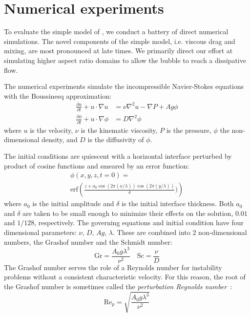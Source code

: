 \section{Numerical experiments} 

To evaluate the simple model of , we conduct a battery of direct numerical simulations.
The novel components of the simple model, i.e. viscous drag and mixing, are most pronounced at late times.
We primarily direct our effort at simulating higher aspect ratio domains to allow the bubble to reach a dissipative flow.

The numerical experiments simulate the incompressible Navier-Stokes equations with the Boussinesq approximation:
\begin{align}
\frac{\partial u}{\partial t} + u \cdot \nabla u &= \nu \nabla^2 u - \nabla P + A g \phi \\
\frac{\partial \phi}{\partial t} + u \cdot \nabla \phi &= D \nabla^2 \phi 
\end{align}
where $u$ is the velocity,
$\nu$ is the kinematic viscosity,
$P$ is the pressure,
$\phi$ the non-dimensional density,
and $D$ is the diffusivity of $\phi$.

The initial conditions are quiescent with a horizontal interface perturbed by product of cosine functions and smeared by an error function:
\begin{equation}
\begin{split}
	\phi(x,y,z,t=0) = \\ 
	\text{erf}\left(\frac{z + a_0 \cos(2 \pi (x/\lambda)) \cos(2 \pi (y/\lambda))}{\delta})\right)
\end{split}
\end{equation}
where $a_0$ is the initial amplitude and $\delta$ is the initial interface thickness.
Both $a_0$ and $\delta$ are taken to be small enough to minimize their effects on the solution, $0.01$ and $1/128$, respectively.
The governing equations and initial condition have four dimensional parameters: $\nu$, $D$, $Ag$, $\lambda$.
These are combined into 2 non-dimensional numbers, the Grashof number and the Schmidt number:
\begin{equation}
\text{Gr} = \frac{A_0 g \lambda^3}{\nu^2} \quad \text{Sc} = \frac{\nu}{D}
\end{equation}
The Grashof number serves the role of a Reynolds number for instability problems without a consistent characteristic velocity.
For this reason, the root of the Grashof number is sometimes called the \textit{perturbation Reynolds number}~\cite{Wei2012}:
\begin{equation}
\text{Re}_p = \sqrt{\frac{A_0 g \lambda^3}{\nu^2}}
\end{equation}

